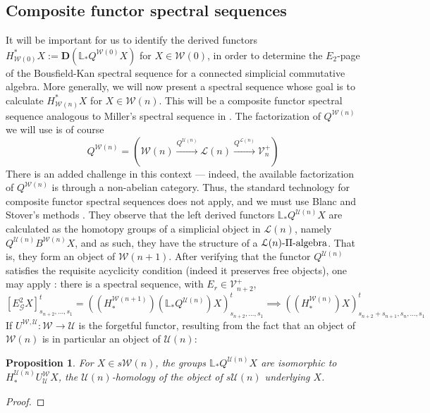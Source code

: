 \documentclass[11pt]{amsart} \renewcommand{\baselinestretch}{1.2}
\theoremstyle{plain}
\newtheorem{prop}[thm]{Proposition}
\theoremstyle{definition}
\renewcommand{\to}{\longrightarrow}
\newcommand{\scrG}{\mathscr{G}}
\newcommand{\calU}{\mathcal{U}}
\newcommand{\calL}{\mathcal{L}}
\newcommand{\calV}{\mathcal{V}}
\newcommand{\calw}{\mathcal{W}}
\newcommand{\citeBOX}[2][]{\cite[\mbox{#1}]{#2}}
\newcommand{\vect}[2]{\calV^{#1}_{#2}}
\newcommand{\BSW}{{\scrG}}
\newcommand{\E}[5]{[E^{#1}_{#2}#3]^{#4}_{#5}}
\newcommand{\dual}{\mathbf{D}}
\begin{document}
\begin{Composite functor spectral sequences}

\section{\textbf{Composite functor spectral sequences}}
\label{Composite functor spectral sequences}
It will be important for us to identify the derived functors $H^*_{\calw(0)}X:=\dual(\mathbb{L}_*Q^{\calw(0)}X)$ for $X\in\calw(0)$, in order to determine the  $E_2$-page of the Bousfield-Kan spectral sequence for a connected simplicial commutative algebra. More generally, we will now present a spectral sequence whose goal is to calculate $H^*_{\calw(n)}X$ for $X\in\calw(n)$. This will be a composite functor spectral sequence analogous to Miller's spectral sequence in \citeBOX[\S2]{MillerSullivanConjecture.pdf}. The factorization of $Q^{\calw(n)}$ we will use is of course 
\[Q^{\calw(n)}=\left(\calw(n)\overset{Q^{\calU(n)}}{\to}\calL(n)\overset{Q^{\calL(n)}}{\to}\vect{+}{n}\right)\]
There is an added challenge in this context --- indeed, the available factorization of $Q^{\calw(n)}$ is through a non-abelian category. Thus, the standard technology for composite functor spectral sequences does not apply, and we must use Blanc and Stover's methods \cite{Blanc_Stover-Groth_SS.pdf}. They observe that the left derived functors $\mathbb{L}_*Q^{\calU(n)}X$ are calculated as the homotopy groups of a simplicial object in $\calL(n)$, namely $Q^{\calU(n)}B^{\calw(n)}X$, and as such, they have the structure of a $\calL(n)\textup{-$\Pi$-algebra}$. That is, they form an object of $\calw(n+1)$.  After verifying that the functor $Q^{\calU(n)}$ satisfies the requisite acyclicity condition (indeed it preserves free objects), one may apply \cite[Theorem 4.4]{Blanc_Stover-Groth_SS.pdf}: there is a spectral sequence, with $E_r\in\vect{+}{n+2}$,
\[\E{2}{\BSW}{X}{t}{s_{n+2},\ldots,s_1}=((H_*^{\calw(n+1)})(\mathbb{L}_*Q^{\calU(n)})X)_{s_{n+2},\ldots,s_1}^t\implies ((H_*^{\calw(n)})X)_{s_{n+2}+s_{n+1},s_n,\ldots,s_1}^t\]
If $U^{\calw,\calU}:\calw\to\calU$ is the forgetful functor, resulting from the fact that an object of $\calw(n)$ is in particular an object of $\calU(n)$:
\begin{prop}
\label{what is LQU, dude?}
For $X\in s\calw(n)$, the groups $\mathbb{L}_*Q^{\calU(n)}X$ are isomorphic to $H_*^{\calU(n)}U^{\calw}_{\calU}X$, the $\calU(n)$-homology of the object of $s\calU(n)$ underlying $X$.
\end{prop}
\begin{proof}

\end{proof}
\end{Composite functor spectral sequences}
\end{document}
